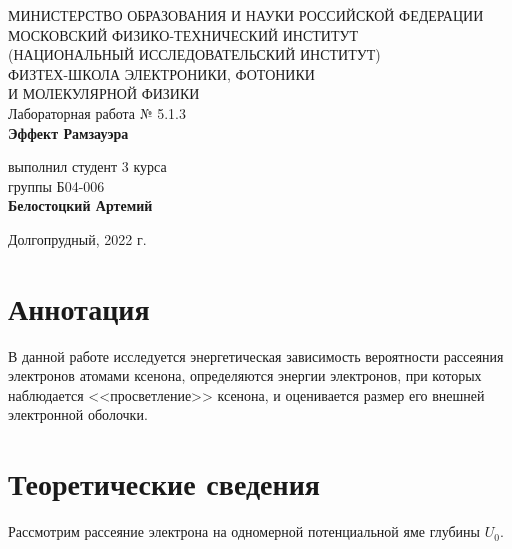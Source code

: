 \documentclass[a4paper,12pt]{article}
\begin{document}
 

\begin{titlepage}
	\begin{center}
		\large 	МИНИСТЕРСТВО ОБРАЗОВАНИЯ И НАУКИ РОССИЙСКОЙ ФЕДЕРАЦИИ\\
				МОСКОВСКИЙ ФИЗИКО-ТЕХНИЧЕСКИЙ ИНСТИТУТ \\
				(НАЦИОНАЛЬНЫЙ ИССЛЕДОВАТЕЛЬСКИЙ ИНСТИТУТ)\\ 
				ФИЗТЕХ-ШКОЛА ЭЛЕКТРОНИКИ, ФОТОНИКИ \\
				И МОЛЕКУЛЯРНОЙ ФИЗИКИ \\
		
		
		\vspace{4.0 cm}
		Лабораторная работа № 5.1.3 \\ 
		\LARGE \textbf{Эффект Рамзауэра}
	\end{center}
	\vspace{3 cm} \large
	
	\begin{flushright}
		выполнил студент 3 курса \\
		{группы Б04-006}\\
		\textbf{Белостоцкий Артемий}\\
	\end{flushright}
	
	\vfill

	\begin{center}
	Долгопрудный, 2022 г.
	\end{center}
\end{titlepage}                                                                      

\section*{Аннотация}

В данной работе исследуется энергетическая зависимость вероятности рассеяния электронов атомами ксенона, определяются энергии электронов, при которых наблюдается <<просветление>> ксенона, и оценивается размер его внешней электронной оболочки.

\section*{Теоретические сведения}

Рассмотрим рассеяние электрона на одномерной потенциальной яме глубины $U_0$.
\end{document}
